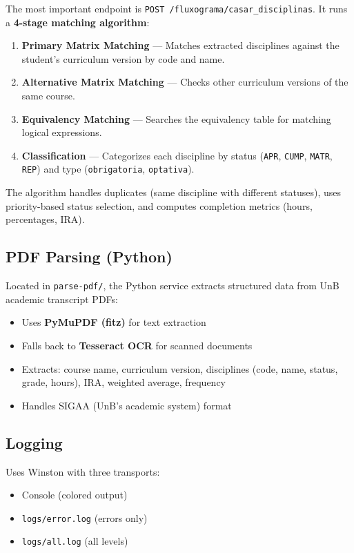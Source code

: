 \documentclass[11pt,a4paper]{article}
\newcommand{\code}[1]{\texttt{#1}}
\begin{document}
The most important endpoint is \code{POST /fluxograma/casar\_disciplinas}. It runs
a \textbf{4-stage matching algorithm}:

\begin{enumerate}[noitemsep]
    \item \textbf{Primary Matrix Matching} — Matches extracted disciplines against
    the student's curriculum version by code and name.
    \item \textbf{Alternative Matrix Matching} — Checks other curriculum versions of
    the same course.
    \item \textbf{Equivalency Matching} — Searches the equivalency table for matching
    logical expressions.
    \item \textbf{Classification} — Categorizes each discipline by status
    (\code{APR}, \code{CUMP}, \code{MATR}, \code{REP}) and type
    (\code{obrigatoria}, \code{optativa}).
\end{enumerate}

The algorithm handles duplicates (same discipline with different statuses), uses
priority-based status selection, and computes completion metrics (hours,
percentages, IRA).

\subsection{PDF Parsing (Python)}

Located in \code{parse-pdf/}, the Python service extracts structured data from UnB
academic transcript PDFs:

\begin{itemize}[noitemsep]
    \item Uses \textbf{PyMuPDF (fitz)} for text extraction
    \item Falls back to \textbf{Tesseract OCR} for scanned documents
    \item Extracts: course name, curriculum version, disciplines (code, name,
    status, grade, hours), IRA, weighted average, frequency
    \item Handles SIGAA (UnB's academic system) format
\end{itemize}

\subsection{Logging}

Uses Winston with three transports:
\begin{itemize}[noitemsep]
    \item Console (colored output)
    \item \code{logs/error.log} (errors only)
    \item \code{logs/all.log} (all levels)
\end{itemize}
\end{document}
